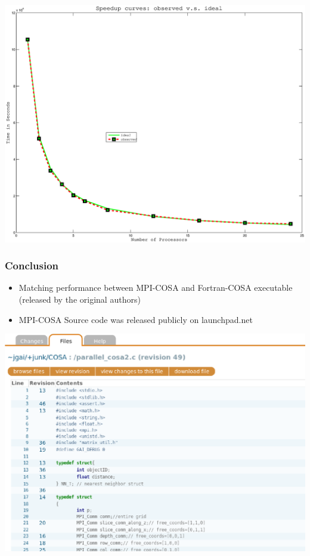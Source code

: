 \documentclass{beamer}
\begin{document}
\begin{frame}
\begin{center} 
  \includegraphics[width=1.0\textwidth]{figures/speedup.eps} 
\end{center}
\end{frame}

\begin{frame}
\frametitle{Conclusion}
\begin{itemize}
\item Matching performance between MPI-COSA and Fortran-COSA executable (released by the original authors)
\item MPI-COSA Source code was released publicly on launchpad.net
\end{itemize}
\begin{center} 
  \includegraphics[height=0.5\textwidth]{figures/mybzr2.eps} 
\end{center}
\end{frame}
\end{document}
